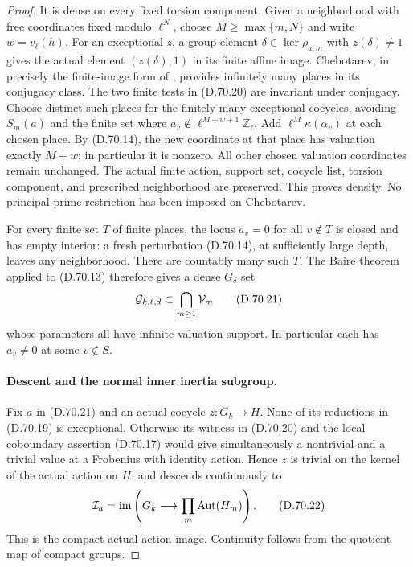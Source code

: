 \begin{proof}
It is dense on every fixed torsion component.
Given a neighborhood with free coordinates
fixed modulo \(\ell^N\), choose
\(M\ge\max\{m,N\}\) and write \(w=v_\ell(h)\).
For an exceptional \(z\), a group element
\(\delta\in\ker\rho_{a,m}\) with
\(z(\delta)\ne1\) gives the actual element
\((z(\delta),1)\) in its finite affine image.
Chebotarev, in precisely the finite-image
form of \cite[Chapter V, Theorem 3.23]{PBC_MilneCFT},
provides infinitely many places in its
conjugacy class. The two finite tests in
(D.70.20) are invariant under conjugacy.
Choose distinct such places for the
finitely many exceptional cocycles, avoiding
\(S_m(a)\) and the finite set where
\(a_v\notin\ell^{M+w+1}\mathbb Z_\ell\).
Add \(\ell^M\kappa(\alpha_v)\) at each
chosen place. By (D.70.14), the new
coordinate at that place has valuation
exactly \(M+w\); in particular it is
nonzero. All other chosen valuation
coordinates remain unchanged. The actual
finite action, support set, cocycle list,
torsion component, and prescribed
neighborhood are preserved. This proves
density. No principal-prime restriction
has been imposed on Chebotarev.

For every finite set \(T\) of finite places,
the locus \(a_v=0\) for all \(v\notin T\)
is closed and has empty interior: a fresh
perturbation (D.70.14), at sufficiently
large depth, leaves any neighborhood.
There are countably many such \(T\).
The Baire theorem applied to (D.70.13)
therefore gives a dense \(G_\delta\) set
\[
 {\cal G}_{k,\ell,d}\subset\bigcap_{m\ge1}{\cal V}_m
                                                        \tag{D.70.21}
\]
whose parameters all have infinite valuation
support. In particular each has \(a_v\ne0\)
at some \(v\notin S\).

\paragraph{Descent and the normal inner inertia subgroup.}
Fix \(a\) in (D.70.21) and an actual
cocycle \(z:G_k\to H\). None of its
reductions in (D.70.19) is exceptional.
Otherwise its witness in (D.70.20) and
the local coboundary assertion (D.70.17)
would give simultaneously a nontrivial
and a trivial value at a Frobenius with
identity action. Hence \(z\) is trivial
on the kernel of the actual action on
\(H\), and descends continuously to
\[
 {\cal I}_a=\operatorname{im}\left(
     G_k\longrightarrow\prod_m\operatorname{Aut}(H_m)\right).
                                                        \tag{D.70.22}
\]
This is the compact actual action image.
Continuity follows from the quotient map
of compact groups.


\end{proof}
